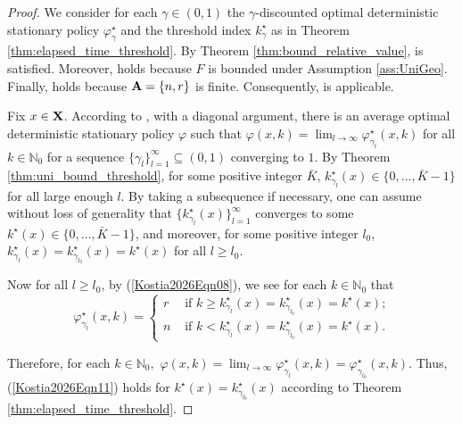 \documentclass[letterpaper,10pt,conference]{ieeeconf}  %
\begin{document}
\begin{proof}
  We consider for each $\gamma\in (0,1)$ the $\gamma$-discounted optimal deterministic stationary policy $\varphi_\gamma^\star$ and the threshold index $k_\gamma^\star$ as in Theorem \ref{thm:elapsed_time_threshold}. 
By Theorem \ref{thm:bound_relative_value}, \cite[Assumption (B)]{Schal1993} is satisfied. Moreover, \cite[General Assumption]{Schal1993} holds because $F$ is bounded under  Assumption \ref{ass:UniGeo}. Finally, \cite[Assumption (S)]{Schal1993} holds because ${\bf A}=\{n,r\}$ is finite. Consequently,  \cite[Theorem 3.8]{Schal1993} is applicable. 

 Fix $x\in {\bf X}$. According to  \cite[Theorem 3.8]{Schal1993}, with a diagonal argument, there is an average optimal deterministic stationary policy $\varphi$ such that $\varphi(x,k)=\lim_{l\rightarrow\infty}\varphi_{\gamma_l}^\star(x,k)$ for all $k\in\mathbb{N}_0$ for a sequence $\{\gamma_l\}_{l=1}^\infty\subseteq(0,1)$ converging to $1$. 
By Theorem \ref{thm:uni_bound_threshold}, for some positive integer $\bar{K}$, $k_{\gamma_l}^\star(x)\in \{0,\dots,\bar{K}-1\}$ for all large enough $l$. By taking a subsequence if necessary, one can assume without loss of generality that $\{k_{\gamma_l}^\star(x)\}_{l=1}^\infty$ converges to some $k^\star(x)\in \{0,\dots,\bar{K}-1\}$, and moreover, for some positive integer $l_0$, 
$
k_{\gamma_l}^\star(x)=k_{\gamma_{l_0}}^\star(x)=k^\star(x)$ for all $l\ge l_0$.

Now for all $l\ge l_0$, by (\ref{Kostia2026Eqn08}), we see for each $k\in\mathbb{N}_0$ that $$\varphi_{\gamma_l}^{\star}(x,k)=\begin{cases}
r &\mbox{ if $k\ge k_{\gamma_l}^\star(x)=k^\star_{\gamma_{l_0}}(x)=k^\star(x)$;}\\
n &\mbox{ if $k< k_{\gamma_l}^\star(x)=k_{\gamma_{l_0}}^\star(x)=k^\star(x)$.}
\end{cases}$$

Therefore, for each $k\in\mathbb{N}_0,$ $\varphi(x,k)=\lim_{l\rightarrow \infty}\varphi_{\gamma_l}^\star(x,k)=\varphi_{\gamma_{l_0}}^\star(x,k).$ Thus,  (\ref{Kostia2026Eqn11}) holds for $k^\star(x)=k_{\gamma_{l_0}}^\star(x)$ according to Theorem \ref{thm:elapsed_time_threshold}. 
\end{proof}
\end{document}
